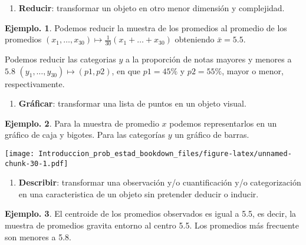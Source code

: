 \documentclass[]{book}
\providecommand{\tightlist}{%
  \setlength{\itemsep}{0pt}\setlength{\parskip}{0pt}}
\theoremstyle{definition}
\theoremstyle{definition}
\newtheorem{example}{Ejemplo.}[chapter]
\theoremstyle{definition}
\theoremstyle{remark}
\begin{document}
\begin{enumerate}
\def\labelenumi{\arabic{enumi}.}
\setcounter{enumi}{2}
\tightlist
\item
  \textbf{Reducir}: transformar un objeto en otro menor dimensión y
  complejidad.
\end{enumerate}

\begin{example}
\protect\hypertarget{exm:unnamed-chunk-27}{}{\label{exm:unnamed-chunk-27} }Podemos reducir la muestra de los promedios al promedio de los promedios
\((x_1,\ldots,x_{30}) \mapsto \frac{1}{30}(x_1+\ldots+x_{30})\) obteniendo \(\bar{x}= 5 .5\).

Podemos reducir las categorias \(y\) a la proporción de notas mayores y menores a \(5 .8\)
\((y_1,\ldots,y_{30}) \mapsto (p1,p2)\), en que \(p1= 45\%\)
y \(p2= 55\%\), mayor o menor, respectivamente.
\end{example}

\begin{enumerate}
\def\labelenumi{\arabic{enumi}.}
\setcounter{enumi}{3}
\tightlist
\item
  \textbf{Gráficar}: transformar una lista de puntos en un objeto visual.
\end{enumerate}

\begin{example}
\protect\hypertarget{exm:unnamed-chunk-28}{}{\label{exm:unnamed-chunk-28} }
Para la muestra de promedio \(x\) podemos representarlos en un gráfico de caja y bigotes. Para las categorías
\(y\) un gráfico de barras.
\end{example}

\texttt{[image: Introduccion\_prob\_estad\_bookdown\_files/figure-latex/unnamed-chunk-30-1.pdf]}

\begin{enumerate}
\def\labelenumi{\arabic{enumi}.}
\setcounter{enumi}{4}
\tightlist
\item
  \textbf{Describir}: transformar una observación y/o cuantificación y/o categorización en una caracteristica
  de un objeto sin pretender deducir o inducir.
\end{enumerate}

\begin{example}
\protect\hypertarget{exm:unnamed-chunk-31}{}{\label{exm:unnamed-chunk-31} }
El centroide de los promedios observados es igual a 5.5, es decir, la muestra de promedios gravita entorno al centro 5.5. Los promedios más frecuente son menores a 5.8.
\end{example}
\end{document}
